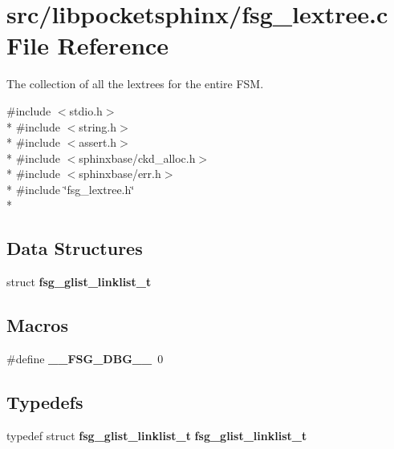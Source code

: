 \section{src/libpocketsphinx/fsg\-\_\-lextree.c File Reference}
\label{fsg__lextree_8c}


The collection of all the lextrees for the entire F\-S\-M.  


{\ttfamily \#include $<$stdio.\-h$>$}\\*
{\ttfamily \#include $<$string.\-h$>$}\\*
{\ttfamily \#include $<$assert.\-h$>$}\\*
{\ttfamily \#include $<$sphinxbase/ckd\-\_\-alloc.\-h$>$}\\*
{\ttfamily \#include $<$sphinxbase/err.\-h$>$}\\*
{\ttfamily \#include \char`\"{}fsg\-\_\-lextree.\-h\char`\"{}}\\*
\subsection*{Data Structures}
\begin{DoxyCompactItemize}
\item 
struct {\bf fsg\-\_\-glist\-\_\-linklist\-\_\-t}
\end{DoxyCompactItemize}
\subsection*{Macros}
\begin{DoxyCompactItemize}
\item 
\#define {\bfseries \-\_\-\-\_\-\-F\-S\-G\-\_\-\-D\-B\-G\-\_\-\-\_\-}~0\label{fsg__lextree_8c_a7acaaaaea00ab148fa241f7ce86cab14}

\end{DoxyCompactItemize}
\subsection*{Typedefs}
\begin{DoxyCompactItemize}
\item 
typedef struct {\bf fsg\-\_\-glist\-\_\-linklist\-\_\-t} {\bfseries fsg\-\_\-glist\-\_\-linklist\-\_\-t}\label{fsg__lextree_8c_a0ed5b76987ef1e416b40a06a9d80902f}

\end{DoxyCompactItemize}
